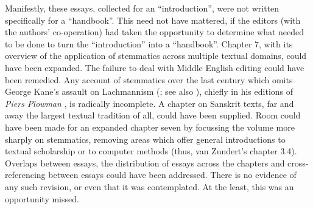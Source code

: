 \begin{review}
Manifestly, these essays, collected for an ``introduction'',
were not written specifically for a ``handbook''. This need not have
mattered, if the editors (with the authors' co-operation) had taken the
opportunity to determine what needed to be done to turn the
``introduction'' into a ``handbook''. Chapter 7, with its overview of
the application of stemmatics across multiple textual domains, could
have been expanded. The failure to deal with Middle English editing
could have been remedied. Any account of stemmatics over the last
century which omits George Kane's assault on Lachmannism (\cite{kane_john_1984}; see also \cite[102--18]{donaldson_psychology_1970}), chiefly in his editions of \emph{Piers Plowman} \parencite{langland_piers_1960,langland_piers_1975}, is radically incomplete. A chapter on Sanskrit
texts, far and away the largest textual tradition of all, could have
been supplied. Room could have been made for an expanded chapter seven
by focussing the volume more sharply on stemmatics, removing areas which
offer general introductions to textual scholarship or to computer
methods (thus, van Zundert's chapter 3.4). Overlaps between essays, the
distribution of essays across the chapters and cross-referencing between
essays could have been addressed. There is no evidence of any such
revision, or even that it was contemplated. At the least, this was an
opportunity missed.


\end{review}
